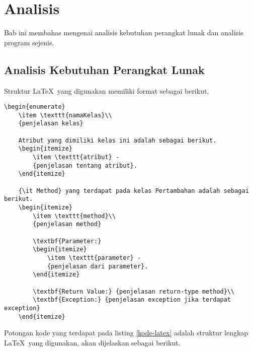 \lstset{style=mystyle}
\chapter{Analisis}
\label{sec:analisis}

Bab ini membahas mengenai analisis kebutuhan perangkat lunak dan analisis program sejenis.

\section{Analisis Kebutuhan Perangkat Lunak}
\label{sec:analisis}

Struktur \LaTeX\ yang digunakan memiliki format sebagai berikut.
\begin{lstlisting}[caption=Potongan kode \LaTeX, label={kode-latex}]
	\begin{enumerate}
	\item \texttt{namaKelas}\\
	{penjelasan kelas}
	
	Atribut yang dimiliki kelas ini adalah sebagai berikut.
	\begin{itemize}
		\item \texttt{atribut} -
		{penjelasan tentang atribut}.
	\end{itemize}
	
	{\it Method} yang terdapat pada kelas Pertambahan adalah sebagai berikut.
	\begin{itemize}
		\item \texttt{method}\\
		{penjelasan method}
		
		\textbf{Parameter:}
		\begin{itemize}
			\item \texttt{parameter} - 
			{penjelasan dari parameter}.
		\end{itemize}
		
		\textbf{Return Value:} {penjelasan return-type method}\\
		\textbf{Exception:} {penjelasan exception jika terdapat exception}
	\end{itemize}

\end{lstlisting}

Potongan kode yang terdapat pada listing \ref{kode-latex} adalah struktur lengkap \LaTeX\ yang digunakan, akan dijelaskan sebagai berikut.

